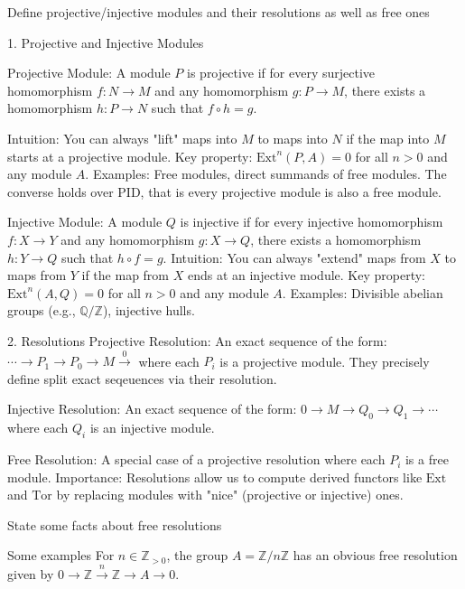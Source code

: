 Define projective/injective modules and their resolutions as well as free ones

1. Projective and Injective Modules

Projective Module: A module \( P \) is projective if for every surjective homomorphism \( f: N → M \) and any homomorphism \( g: P → M \), 
there exists a homomorphism \( h: P → N \) such that \(f ∘ h = g\).



Intuition: You can always "lift" maps into \( M \) to maps into \( N \) if the map into \( M \) starts at a projective module.
Key property: \( \text{Ext}^n(P, A) = 0 \) for all \( n > 0 \) and any module \( A \).
Examples: Free modules, direct summands of free modules.
The converse holds over PID, that is every projective module is also a free module. 

Injective Module: A module \( Q \) is injective if for every injective homomorphism \( f: X → Y \) and any homomorphism \( g: X \to Q \), 
there exists a homomorphism \( h: Y → Q \) such that \( h ∘ f = g \).
Intuition: You can always "extend" maps from \( X \) to maps from \( Y \) if the map from \( X \) ends at an injective module.
Key property: \( \text{Ext}^n(A, Q) = 0 \) for all \( n > 0 \) and any module \( A \).
Examples: Divisible abelian groups (e.g., \( \mathbb{Q}/\mathbb{Z} \)), injective hulls.

2. Resolutions
Projective Resolution: An exact sequence of the form:
\(\cdots \longrightarrow P_1 \longrightarrow P_0 \longrightarrow M \xrightarrow 0\)
where each \( P_i \) is a projective module.
They precisely define split exact seqeuences via their resolution.

Injective Resolution: An exact sequence of the form:
\(0 \longrightarrow M \longrightarrow Q_0 \longrightarrow Q_1 \longrightarrow \cdots \)
where each \( Q_i \) is an injective module.

Free Resolution: A special case of a projective resolution where each \( P_i \) is a free module.
Importance: Resolutions allow us to compute derived functors like \( \text{Ext} \) and \( \text{Tor} \) by replacing modules with 
"nice" (projective or injective) ones.


State some facts about free resolutions

Some examples 
For \(n \in \mathbb{Z}_{>0}\), the group \(A = \mathbb{Z} / n \mathbb{Z}\) has an obvious free resolution given by
\(0 \longrightarrow \mathbb{Z} \xrightarrow{n} \mathbb{Z} \longrightarrow A \longrightarrow 0.\)

